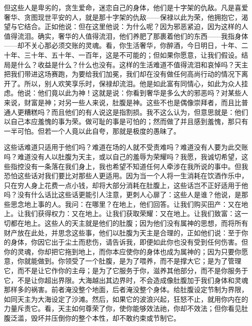 但这些人是卑劣的，贪生爱命，迷恋自己的身体，他们是十字架的仇敌。凡是喜爱奢华、贪图现世平安的人，就是那十字架的仇敌——保禄以此为荣，他拥抱它，渴望与它结合。正如他说：但在这里他说：为什么呢？因为邪恶紧迫，因为这样的人值得流泪。确实，奢华的人值得流泪，他们养肥了那裹着他们的东西——我指身体——却不关心那必须交账的灵魂。看，你生活奢华，你醉酒，今日明日，十年、二十年、三十年、五十年、一百年，这是不可能的；但如果你愿意，让我们假设。结局是什么？收益是什么？什么也没有。这样的生活难道不值得流泪和哀悼吗？天主把我们带进这场赛跑，为要给我们加冕，我们却在没有做任何高尚行动的情况下离开了。所以，别人欢笑享乐时，保禄却流泪。他是如此富有同情心，如此为众人挂虑。他说：他们竟以此为神！这就是说：你看到奢华是多么大的邪恶吗？对某些人来说，财富是神；对另一些人来说，肚腹是神。这些不也是偶像崇拜者，而且比普通人更糟糕吗？而且他们的有人说这是指割损。我不这么认为，但意思就是：他们以自己本应羞愧的事为荣。做可耻的事是可怕的；然而做了并且感到羞愧，那只有一半可怕。但若一个人竟以此自夸，那就是极度的愚昧了。\par

这些话难道只适用于他们吗？难道在场的人就不受责难吗？难道没有人要为此交账吗？难道没有人以肚腹为天主，或以自己的羞辱为荣耀吗？我愿，我诚切希望，这些指控没有一条落在我们身上，我也希望不知道任何人牵涉在我所说的事中。但我恐怕这些话对我们要比对那些人更适用。因为当一个人将一生消耗在饮酒作乐中，只在穷人身上花费一点小钱，却将大部分消耗在肚腹上，这些话岂不正好适用于他吗？没有什么话比这些话更能引人注意，更刺人心扉了：这些人是谁？他说，是那些思念地上事的人。我问：在哪里？在地上，他们回答。让我们购买田产：又在地上。让我们获得权力：又在地上。让我们获取荣耀：又在地上。让我们致富：这一切都在地上。这些人的天主就是他们的肚腹；因为他们没有属神的思想，而将所有财产放在此处，并思念这些事，他们以肚腹为天主是合理的，正如他们说：至于你的身体，你因它出于尘土而悲伤，请告诉我，即便如此你也没有受到任何伤害。但你的灵魂，你却把它拖到地上，而你本应使你的身体也成为属神的；因为只要你愿意，你就能做到。你领受了一个肚腹，是为了喂养，而不是撑大它；是为了管理它，而不是让它作你的主母；是为了它服务于你，滋养其他部分，而不是你服务于它，不是让你超出界限。大海越出其边界时，不会造成像肚腹加于我们身体和灵魂那样多的祸害。前者淹没整个地面，后者淹没整个身体。给肚腹设定节制为界限，如同天主为大海设定了沙滩。然后，如果它的波浪兴起，狂怒不止，就用你内在的力量斥责它。看，天主如何尊荣了你，使你能够效法祂，你却不效法；但你看见肚腹泛滥，毁坏并压倒你的整个本性，却不敢约束或节制它。\par

